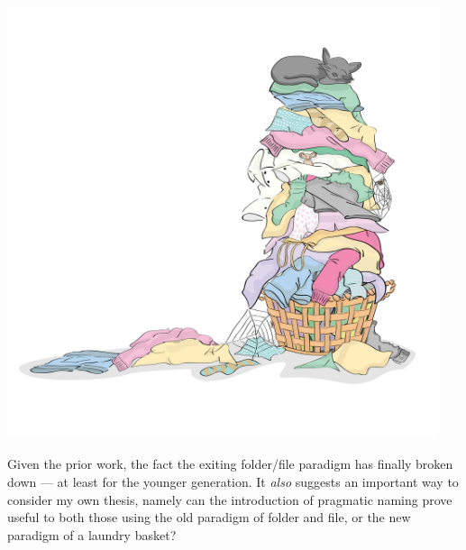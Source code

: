\includegraphics[width=0.95\textwidth]{figures/laundry-basket-with-cat-on-top.png}

Given the prior work, the fact the exiting folder/file paradigm has finally
broken down --- at least for the younger generation.  It \emph{also} suggests an
important way to consider my own thesis, namely can the introduction of
pragmatic naming prove useful to both those using the old paradigm of folder and
file, or the new paradigm of a laundry basket?

